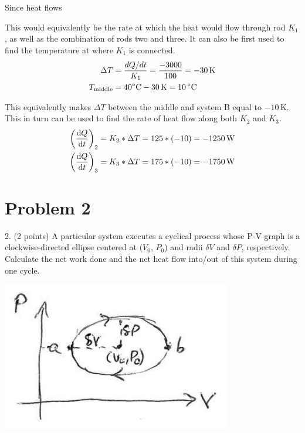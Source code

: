 \documentclass[12pt]{article}
\begin{document}
            Since heat flows 

            This would equivalently be the rate at which the heat would flow through rod $K_1$, as well as the combination of rods two and three.
            It can also be first used to find the temperature at where $K_1$ is connected.
            \begin{align}
                \Delta T    &=  \frac{dQ/dt}{K_1}
                    =   \frac{-3000}{100}
                    =   -30\,\unit{\kelvin}\\
                T_{\rm middle}  &=  40\unit{\celsius} - 30\,\unit{\kelvin}
                    =   10\,\unit{\celsius}
            \end{align}

            This equivalently makes $\Delta T$ between the middle and system B equal to $-10\,\unit{\kelvin}$. 
            This in turn can be used to find the rate of heat flow along both $K_2$ and $K_3$.
            \begin{align}
                \left( \dv{Q}{t} \right)_2  &=  K_2 * \Delta T
                    =   125 * (-10)
                    =   -1250\,\unit{\watt}\\
                \left( \dv{Q}{t} \right)_3  &=  K_3 * \Delta T
                    =   175 * (-10)
                    =   -1750\,\unit{\watt}
            \end{align}

    \pagebreak
    \section{Problem 2}
        2. (2 points) A particular system executes a cyclical process whose P-V graph is a clockwise-directed ellipse centered at ($V_0$, $P_0$) and radii $\delta V$ and $\delta P$, respectively. 
        Calculate the net work done and the net heat ﬂow into/out of this system during one cycle.
        \begin{center}
            \includegraphics{picture_2.png}
        \end{center}
\end{document}
